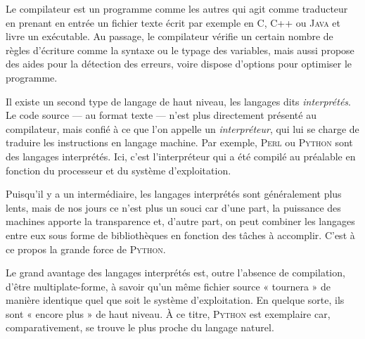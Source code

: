 Le compilateur est un programme comme les autres qui agit comme traducteur en prenant en entrée un fichier texte écrit par exemple en C, C++ ou \textsc{Java} et livre un exécutable. Au passage, le compilateur vérifie un certain nombre de règles d'écriture comme la syntaxe ou le typage des variables, mais aussi propose des aides pour la détection des erreurs, voire dispose d'options pour optimiser le programme.

Il existe un second type de langage de haut niveau, les langages dits \emph{interprétés}. Le code source --- au format texte --- n'est plus directement présenté au compilateur, mais confié à ce que l'on appelle un \emph{interpréteur}, qui lui se charge de traduire les instructions en langage machine. Par exemple, \textsc{Perl} ou \textsc{Python} sont des langages interprétés. Ici, c'est l'interpréteur qui a été compilé au préalable en fonction du processeur et du système d'exploitation.

Puisqu'il y a un intermédiaire, les langages interprétés sont généralement plus lents, mais de nos jours ce n'est plus un souci car d'une part, la puissance des machines apporte la transparence et, d'autre part, on peut combiner les langages entre eux sous forme de bibliothèques en fonction des tâches à accomplir. C'est à ce propos la grande force de \textsc{Python}.

Le grand avantage des langages interprétés est, outre l’absence de compilation, d'être multiplate-forme, à savoir qu'un même fichier sour\-ce « tournera » de manière identique quel que soit le système d'exploitation. En quelque sorte, ils sont « encore plus » de haut niveau. À ce titre, \textsc{Python} est exemplaire car, comparativement, se trouve le plus proche du langage naturel.

